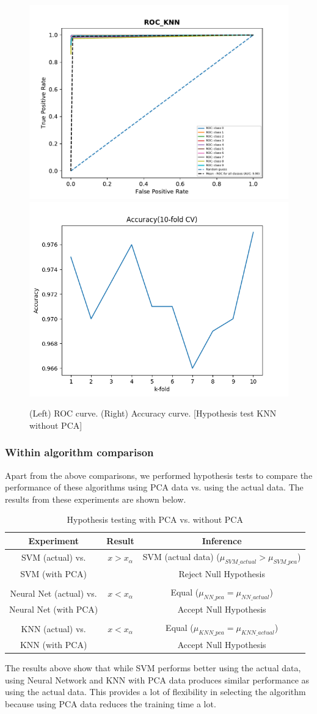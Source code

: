 \documentclass[10pt]{scrartcl}
\begin{document}
\begin{itemize}
\begin{figure}[H]
\centering
\includegraphics[width=0.45\linewidth]{figures/KNN_ROC_K_3_fold_1.pdf} 
\includegraphics[width=0.45\linewidth]{figures/accuracy_knn_without_PCA.png}
\caption{(Left) ROC curve. (Right) Accuracy curve. [Hypothesis test KNN without PCA] \label{fig:hypo_knn_roc_acc_act}}
\end{figure}

\end{itemize}

\subsubsection*{Within algorithm comparison}

Apart from the above comparisons, we performed hypothesis tests to compare the performance of these algorithms using PCA data vs. using the actual data. The results from these experiments are shown below. 

\begin{table}[H] 
\centering
\begin{tabular}{ c|c|c }
 \textbf{Experiment} & \textbf{Result} & \textbf{Inference} \\ 
 \hline
SVM (actual) vs. & $x > x_{\alpha}$ & SVM (actual data) ($\mu_{SVM\_actual} > \mu_{SVM\_pca}$) \\ 
SVM (with PCA) & & Reject Null Hypothesis \\ 
& & \\
Neural Net (actual) vs. & $x < x_{\alpha}$ &  Equal ($\mu_{NN\_pca} = \mu_{NN\_actual}$) \\
Neural Net (with PCA)  & & Accept Null Hypothesis\\ 
& & \\
KNN (actual) vs. & $x < x_{\alpha}$ &  Equal ($\mu_{KNN\_pca} = \mu_{KNN\_actual}$) \\
KNN (with PCA)  & & Accept Null Hypothesis\\ 
\end{tabular}
\caption{Hypothesis testing with PCA vs. without PCA \label{tab:hypo_pca_vs_act}}
\end{table}
 
The results above show that while SVM performs better using the actual data, using Neural Network and KNN with PCA data produces similar performance as using the actual data. This provides a lot of flexibility in selecting the algorithm because using PCA data reduces the training time a lot. 
 
\end{document}
